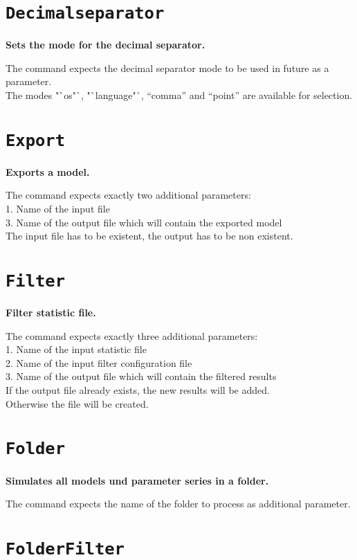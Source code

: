 \section{\texttt{Decimalseparator}}

\textbf{Sets the mode for the decimal separator.}

The command expects the decimal separator mode to be used in future as a parameter.\\
The modes "`os"`, "`language"`, "`comma"' and "`point"' are available for selection.

\section{\texttt{Export}}

\textbf{Exports a model.}

The command expects exactly two additional parameters:\\
1. Name of the input file\\
3. Name of the output file which will contain the exported model\\
The input file has to be existent, the output has to be non existent.

\section{\texttt{Filter}}

\textbf{Filter statistic file.}

The command expects exactly three additional parameters:\\
1. Name of the input statistic file\\
2. Name of the input filter configuration file\\
3. Name of the output file which will contain the filtered results\\
If the output file already exists, the new results will be added.\\
Otherwise the file will be created.

\section{\texttt{Folder}}

\textbf{Simulates all models und parameter series in a folder.}

The command expects the name of the folder to process as additional parameter.

\section{\texttt{FolderFilter}}

